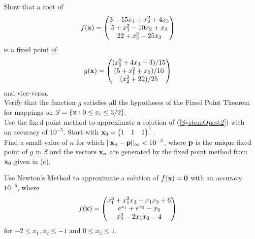 \begin{question}
 Show that a root of
\begin{equation} \label{SystemQuest2}
f(\mathbf{x}) = \begin{pmatrix}
3 -15 x_1 + x_2^2 + 4 x_3 \\
5 + x_1^2 -10 x_2 + x_3 \\
22 +x_2^3 - 25 x_3
\end{pmatrix}
\end{equation}
is a fixed point of
\[
g(\mathbf{x}) =
\begin{pmatrix}
(x_2^2 + 4 x_3 + 3)/15 \\
(5 +x_1^2 +x_3)/10 \\
(x_2^3 +22)/25
\end{pmatrix}
\]
and vice-versa.\\
 Verify that the function $g$ satisfies all the hypotheses
of the Fixed Point Theorem for mappings on
$S =\left\{ \mathbf{x} : 0 \leq x_i \leq 3/2 \right\}$.\\
 Use the fixed point method to approximate a
solution of (\ref{SystemQuest2}) with an accuracy of $10^{-5}$.  Start with
$\displaystyle \mathbf{x}_0 = \begin{pmatrix} 1 & 1 & 1 \end{pmatrix}^\top$.\\
 Find a small value of $n$ for which 
$\| \mathbf{x}_n - \mathbf{p}\|_\infty < 10^{-5}$, where $\mathbf{p}$ is the
unique fixed point of $g$ in $S$ and the vectors $\mathbf{x}_n$
are generated by the fixed point method from $\mathbf{x}_0$ given in (c).
\label{solvDQ5}
\end{question}

\begin{question}
Use Newton's Method to approximate a solution of $f(\mathbf{x}) = \mathbf{0}$
with an accuracy $10^{-6}$, where
\[
f(\mathbf{x}) = \begin{pmatrix}
x_1^3 + x_1^2 x_2 - x_1 x_3 + 6 \\
e^{x_1} + e^{x_2} - x_3 \\
x_2^2 - 2 x_1 x_3 -4
\end{pmatrix}
\]
for $-2 \leq x_1 , x_2 \leq -1$ and $0 \leq x_3 \leq 1$.
\label{solvDQ6}
\end{question}

